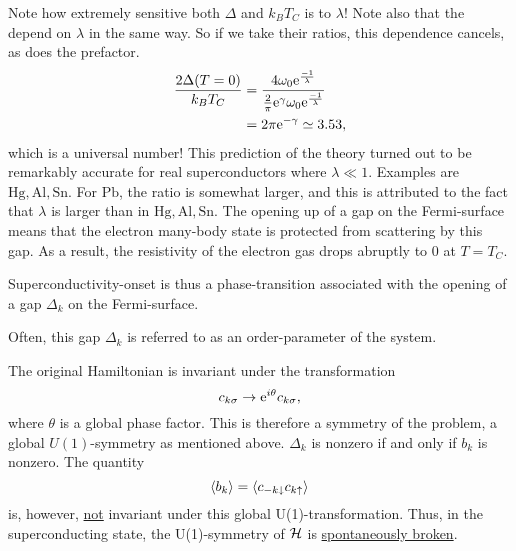 Note how extremely sensitive both $\Delta$ and $k_BT_C$ is to $\lambda$! Note also that the depend on $\lambda$ in the same way. So if we take their ratios, this dependence cancels, as does the prefactor.
\begin{align} 
\frac{2\Delta(T=0)}{k_BT_C} &= \frac{4\omega_0\mathrm{e}^{\frac{-1}{\lambda}}}{\frac{2}{\pi}\mathrm{e}^{\gamma}\omega_0\mathrm{e}^{\frac{-1}{\lambda}}} \\
&=2\pi\mathrm{e}^{-\gamma} \simeq 3.53,
\end{align}
which is a universal number! This prediction of the theory turned out to be remarkably accurate for real superconductors where $\lambda\ll 1$. Examples are $\mathrm{Hg, Al, Sn}$. For $\mathrm{Pb}$, the ratio is somewhat larger, and this is attributed to the fact that $\lambda$ is larger than in $\mathrm{Hg, Al, Sn}$. 
The opening up of a gap on the Fermi-surface means that the electron many-body state is protected from scattering by this gap. As a result, the resistivity of the electron gas drops abruptly to 0 at $T = T_C$. 
\begin{tcolorbox}
	Superconductivity-onset is thus a phase-transition associated with the opening of a gap $\Delta_k$ on the Fermi-surface. 
\end{tcolorbox}
Often, this gap $\Delta_k$ is referred to as an order-parameter of the system. 

The original Hamiltonian is invariant under the transformation
\begin{equation} 
c_{k\sigma} \rightarrow\mathrm{e}^{i\theta}c_{k\sigma},
\end{equation}
where $\theta$ is a global phase factor. This is therefore a symmetry of the problem, a global $U(1)$-symmetry as mentioned above.
$\Delta_k$ is nonzero if and only if $b_k$ is nonzero. The quantity
\begin{equation} 
\ev{b_k} = \ev{c_{-k\downarrow}c_{k\uparrow}}
\end{equation}
is, however, \underline{not} invariant under this global U(1)-transformation. Thus, in the superconducting state, the U(1)-symmetry of $\mathcal{H}$ is \underline{spontaneously broken}.